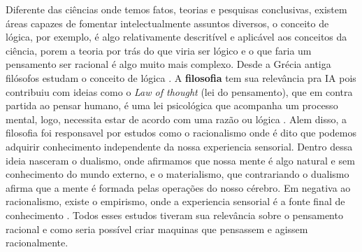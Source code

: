 Diferente das ciências onde temos fatos, teorias e pesquisas conclusivas, existem áreas capazes de fomentar intelectualmente assuntos diversos, o conceito de lógica, por exemplo, é algo relativamente descritível e aplicável aos conceitos da ciência, porem a teoria por trás do que viria ser lógico e o que faria um pensamento ser racional é algo muito mais complexo. Desde a Grécia antiga filósofos estudam o conceito de lógica \cite[4-5]{russell2003artificial}. A \textbf{filosofia} tem sua relevância pra IA pois contribuiu com ideias como o \textit{Law of thought} (lei do pensamento), que em contra partida ao pensar humano, é uma lei psicológica que acompanha um processo mental, logo, necessita estar de acordo com uma razão ou lógica \cite[289-291]{frege1956thought}. Alem disso, a filosofia foi responsavel por estudos como o racionalismo onde é dito que podemos adquirir conhecimento independente da nossa experiencia sensorial. Dentro dessa ideia nasceram o dualismo, onde afirmamos que nossa mente é algo natural e sem conhecimento do mundo externo, e o materialismo, que contrariando o dualismo afirma que a mente é formada pelas operações do nosso cérebro. Em negativa ao racionalismo, existe o empirismo, onde a experiencia sensorial é a fonte final de conhecimento \cite[6]{rationalismvsempiricism, descartes2013rene, russell2003artificial}. Todos esses estudos tiveram sua relevância sobre o pensamento racional e como seria possível criar maquinas que pensassem e agissem racionalmente.
